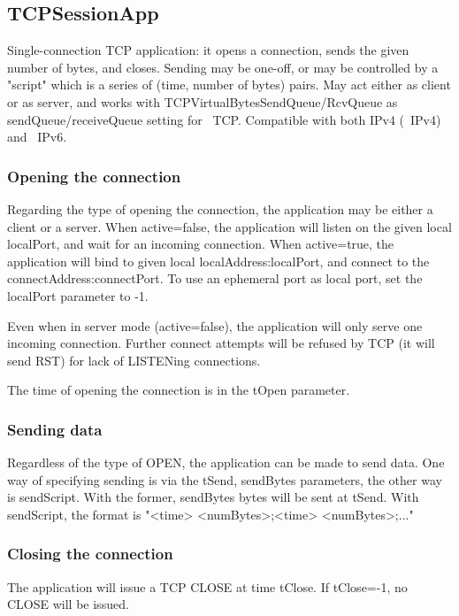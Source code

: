 \subsection{TCPSessionApp}

Single-connection TCP application: it opens a connection, sends
the given number of bytes, and closes. Sending may be one-off,
or may be controlled by a "script" which is a series of
(time, number of bytes) pairs. May act either as client or as server,
and works with TCPVirtualBytesSendQueue/RcvQueue as sendQueue/receiveQueue
setting for ~TCP.
Compatible with both IPv4 (~IPv4) and ~IPv6.

\subsubsection*{Opening the connection}

Regarding the type of opening the connection, the application may
be either a client or a server. When active=false, the application
will listen on the given local localPort, and wait for an incoming connection.
When active=true, the application will bind to given local localAddress:localPort,
and connect to the connectAddress:connectPort. To use an ephemeral port
as local port, set the localPort parameter to -1.

Even when in server mode (active=false), the application will only
serve one incoming connection. Further connect attempts will be
refused by TCP (it will send RST) for lack of LISTENing connections.

The time of opening the connection is in the tOpen parameter.

\subsubsection*{Sending data}

Regardless of the type of OPEN, the application can be made to send
data. One way of specifying sending is via the tSend, sendBytes
parameters, the other way is sendScript. With the former, sendBytes
bytes will be sent at tSend. With sendScript, the format is
"<time> <numBytes>;<time> <numBytes>;..."

\subsubsection*{Closing the connection}

The application will issue a TCP CLOSE at time tClose. If tClose=-1, no
CLOSE will be issued.



